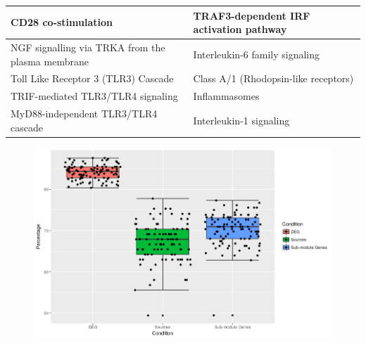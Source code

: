 \documentclass[twocolumn]{article}
\begin{document}
\begin{table}[]
\begin{tabular}{|l|l|}
		CD28 co-stimulation                              & TRAF3-dependent IRF activation pathway          \\ \hline
		NGF signalling via TRKA from the plasma membrane & Interleukin-6 family signaling                  \\ \hline
		Toll Like Receptor 3 (TLR3) Cascade              & Class A/1 (Rhodopsin-like receptors)            \\ \hline
		TRIF-mediated TLR3/TLR4 signaling                & Inflammasomes                                   \\ \hline
		MyD88-independent TLR3/TLR4 cascade              & Interleukin-1 signaling                         \\ \hline
	\end{tabular}
\end{table}

\begin{figure}[th]
	\includegraphics[width=16cm]{AllDEGSources}
	\caption{}
	\label{fig:alldegsources}
\end{figure}
\end{document}
